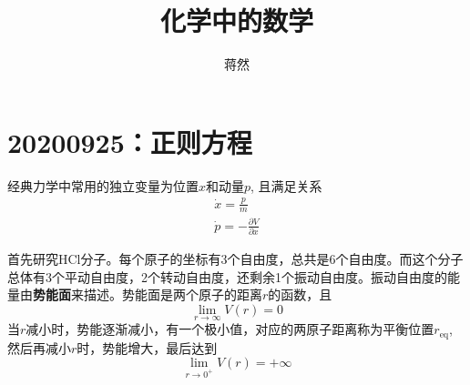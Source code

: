 \documentclass[12pt]{article}
\title{\heiti 化学中的数学}
\author{\kaishu 蒋然}
\begin{document}
\maketitle
\tableofcontents

\section{20200925：正则方程}

    经典力学中常用的独立变量为位置$x$和动量$p$, 且满足关系
    \begin{equation}\begin{aligned}
        \dot{x} = \frac pm\\
        \dot{p} = -\frac {\partial V}{\partial x}
    \end{aligned}\end{equation}

    首先研究HCl分子。每个原子的坐标有3个自由度，总共是6个自由度。而这个分子总体有3个平动自由度，2个转动自由度，还剩余1个振动自由度。振动自由度的能量由\textbf{势能面}来描述。势能面是两个原子的距离$r$的函数，且
    \begin{equation}
        \lim_{r \to \infty} V(r) = 0
    \end{equation}
    当$r$减小时，势能逐渐减小，有一个极小值，对应的两原子距离称为平衡位置$r_\mathrm{eq}$, 然后再减小$r$时，势能增大，最后达到
    \begin{equation}
        \lim_{r \to 0^+} V(r) = +\infty
    \end{equation}
\end{document}
